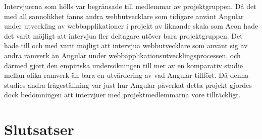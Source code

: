 Intervjuerna som hölls var begränsade till medlemmar av projektgruppen. Då det med all sannolikhet fanns andra webbutvecklare som tidigare använt Angular under utveckling av webbapplikationer i projekt av liknande skala som Aeon hade det varit möjligt att intervjua fler deltagare utöver bara projektgruppen. Det hade till och med varit möjligt att intervjua webbutvecklare som använt sig av andra ramverk än Angular under webbapplikationsutvecklingsprocessen, och därmed gjort den empiriska undersökningen till mer av en komparativ studie mellan olika ramverk än bara en utvärdering av vad Angular tillfört. Då denna studies andra frågeställning var just hur Angular påverkat detta projekt gjordes dock bedömningen att intervjuer med projektmedlemmarna vore tillräckligt.

\section{Slutsatser}

